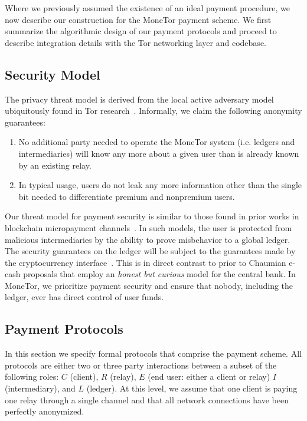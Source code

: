 Where we previously assumed the existence of an ideal payment procedure, we now
describe our construction for the MoneTor payment scheme. We first summarize the
algorithmic design of our payment protocols and proceed to describe integration
details with the Tor networking layer and codebase.

\subsection{Security Model}

The privacy threat model is derived from the local active adversary
model ubiquitously found in Tor research~\cite{dingledine2004tor}. Informally, we claim the following
anonymity guarantees:

\begin{enumerate}
\item No additional party needed to operate the MoneTor system (i.e. ledgers
  and intermediaries) will know any more about a given user than is already
  known by an existing relay. 
\item In typical usage, users do not leak any more information other than the
  single bit needed to differentiate premium and nonpremium users.
\end{enumerate}

Our threat model for payment security is similar to those found in prior works
in blockchain micropayment channels~\cite{poon2016bitcoin}. In such models, the
user is protected from malicious intermediaries by the ability to prove
misbehavior to a global ledger. The security guarantees on the ledger will be
subject to the guarantees made by the cryptocurrency
interface~\cite{back2014enabling, poon2017plasma}. This is in direct contrast to
prior to Chaumian e-cash proposals that employ an \emph{honest but curious}
model for the central bank. In MoneTor, we prioritize payment security and
ensure that nobody, including the ledger, ever has direct control of user funds.

\subsection{Payment Protocols}

In this section we specify formal protocols that comprise the payment
scheme. All protocols are either two or three party interactions between a
subset of the following roles: $C$ (client), $R$ (relay), $E$ (end user: either
a client or relay) $I$ (intermediary), and $L$ (ledger). At this level, we assume that
one client is paying one relay through a single channel and that all network
connections have been perfectly anonymized. 

